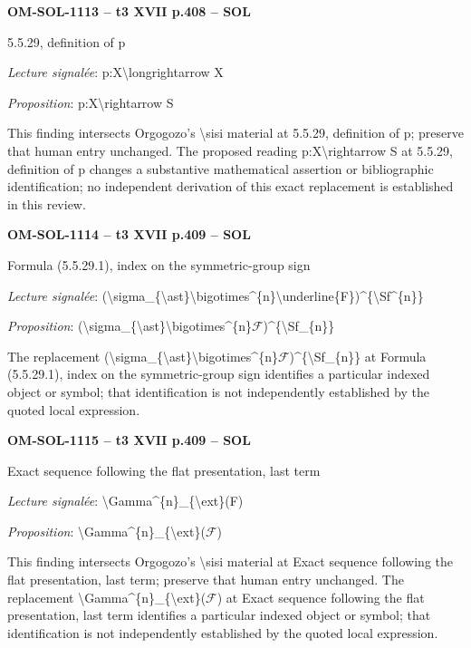 \par\noindent\textbf{OM-SOL-1113 -- t3 XVII p.408 -- SOL}\par
5.5.29, definition of p\par
\emph{Lecture signalée}: p:X\textbackslash{}longrightarrow X\par
\emph{Proposition}: p:X\textbackslash{}rightarrow S\par
This finding intersects Orgogozo's \textbackslash{}sisi material at 5.5.29, definition of p; preserve that human entry unchanged. The proposed reading p:X\textbackslash{}rightarrow S at 5.5.29, definition of p changes a substantive mathematical assertion or bibliographic identification; no independent derivation of this exact replacement is established in this review.\par
\par\noindent\textbf{OM-SOL-1114 -- t3 XVII p.409 -- SOL}\par
Formula (5.5.29.1), index on the symmetric-group sign\par
\emph{Lecture signalée}: (\textbackslash{}sigma\_\{\textbackslash{}ast\}\textbackslash{}bigotimes\textasciicircum{}\{n\}\textbackslash{}underline\{F\})\textasciicircum{}\{\textbackslash{}Sf\textasciicircum{}\{n\}\}\par
\emph{Proposition}: (\textbackslash{}sigma\_\{\textbackslash{}ast\}\textbackslash{}bigotimes\textasciicircum{}\{n\}\ensuremath{\mathcal{F}})\textasciicircum{}\{\textbackslash{}Sf\_\{n\}\}\par
The replacement (\textbackslash{}sigma\_\{\textbackslash{}ast\}\textbackslash{}bigotimes\textasciicircum{}\{n\}\ensuremath{\mathcal{F}})\textasciicircum{}\{\textbackslash{}Sf\_\{n\}\} at Formula (5.5.29.1), index on the symmetric-group sign identifies a particular indexed object or symbol; that identification is not independently established by the quoted local expression.\par
\par\noindent\textbf{OM-SOL-1115 -- t3 XVII p.409 -- SOL}\par
Exact sequence following the flat presentation, last term\par
\emph{Lecture signalée}: \textbackslash{}Gamma\textasciicircum{}\{n\}\_\{\textbackslash{}ext\}(F)\par
\emph{Proposition}: \textbackslash{}Gamma\textasciicircum{}\{n\}\_\{\textbackslash{}ext\}(\ensuremath{\mathcal{F}})\par
This finding intersects Orgogozo's \textbackslash{}sisi material at Exact sequence following the flat presentation, last term; preserve that human entry unchanged. The replacement \textbackslash{}Gamma\textasciicircum{}\{n\}\_\{\textbackslash{}ext\}(\ensuremath{\mathcal{F}}) at Exact sequence following the flat presentation, last term identifies a particular indexed object or symbol; that identification is not independently established by the quoted local expression.\par

